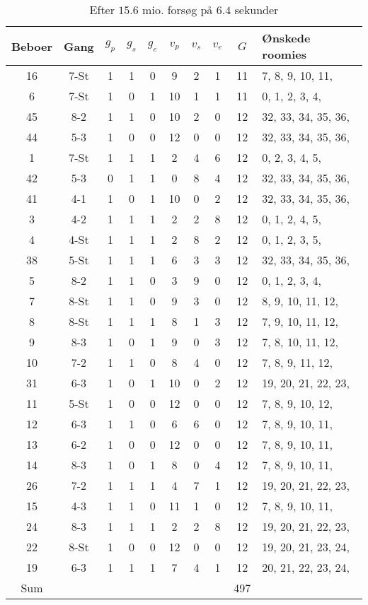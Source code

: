 \documentclass[article,oneside,11pt,a4paper]{memoir}
\newenvironment{assignment}[1]{
\begin{table}[h]
\caption{#1}
\footnotesize
\begin{center}
\begin{tabular}{cccccccccl}
\toprule
Beboer & Gang & $g_p$ & $g_s$ & $g_e$ & $v_p$ & $v_s$ & $v_e$ & $G$ & Ønskede roomies \\ \midrule
}{
\bottomrule
\end{tabular}
\end{center}
\end{table}

}
\begin{document}
\begin{assignment}{Efter $15.6$ mio. forsøg på $6.4$ sekunder}
    16 & 7-St &   1 &   1 &   0 &   9 &   2 &   1 & 11 &   7,  8,  9, 10, 11, \\
     6 & 7-St &   1 &   0 &   1 &  10 &   1 &   1 & 11 &   0,  1,  2,  3,  4, \\
    45 & 8-2  &   1 &   1 &   0 &  10 &   2 &   0 & 12 &  32, 33, 34, 35, 36, \\
    44 & 5-3  &   1 &   0 &   0 &  12 &   0 &   0 & 12 &  32, 33, 34, 35, 36, \\
     1 & 7-St &   1 &   1 &   1 &   2 &   4 &   6 & 12 &   0,  2,  3,  4,  5, \\
    42 & 5-3  &   0 &   1 &   1 &   0 &   8 &   4 & 12 &  32, 33, 34, 35, 36, \\
    41 & 4-1  &   1 &   0 &   1 &  10 &   0 &   2 & 12 &  32, 33, 34, 35, 36, \\
     3 & 4-2  &   1 &   1 &   1 &   2 &   2 &   8 & 12 &   0,  1,  2,  4,  5, \\
     4 & 4-St &   1 &   1 &   1 &   2 &   8 &   2 & 12 &   0,  1,  2,  3,  5, \\
    38 & 5-St &   1 &   1 &   1 &   6 &   3 &   3 & 12 &  32, 33, 34, 35, 36, \\
     5 & 8-2  &   1 &   1 &   0 &   3 &   9 &   0 & 12 &   0,  1,  2,  3,  4, \\
     7 & 8-St &   1 &   1 &   0 &   9 &   3 &   0 & 12 &   8,  9, 10, 11, 12, \\
     8 & 8-St &   1 &   1 &   1 &   8 &   1 &   3 & 12 &   7,  9, 10, 11, 12, \\
     9 & 8-3  &   1 &   0 &   1 &   9 &   0 &   3 & 12 &   7,  8, 10, 11, 12, \\
    10 & 7-2  &   1 &   1 &   0 &   8 &   4 &   0 & 12 &   7,  8,  9, 11, 12, \\
    31 & 6-3  &   1 &   0 &   1 &  10 &   0 &   2 & 12 &  19, 20, 21, 22, 23, \\
    11 & 5-St &   1 &   0 &   0 &  12 &   0 &   0 & 12 &   7,  8,  9, 10, 12, \\
    12 & 6-3  &   1 &   1 &   0 &   6 &   6 &   0 & 12 &   7,  8,  9, 10, 11, \\
    13 & 6-2  &   1 &   0 &   0 &  12 &   0 &   0 & 12 &   7,  8,  9, 10, 11, \\
    14 & 8-3  &   1 &   0 &   1 &   8 &   0 &   4 & 12 &   7,  8,  9, 10, 11, \\
    26 & 7-2  &   1 &   1 &   1 &   4 &   7 &   1 & 12 &  19, 20, 21, 22, 23, \\
    15 & 4-3  &   1 &   1 &   0 &  11 &   1 &   0 & 12 &   7,  8,  9, 10, 11, \\
    24 & 8-3  &   1 &   1 &   1 &   2 &   2 &   8 & 12 &  19, 20, 21, 22, 23, \\
    22 & 8-St &   1 &   0 &   0 &  12 &   0 &   0 & 12 &  19, 20, 21, 23, 24, \\
    19 & 6-3  &   1 &   1 &   1 &   7 &   4 &   1 & 12 &  20, 21, 22, 23, 24, \\
\midrule
Sum &&&&&&&& 497 & \\
\end{assignment}
\end{document}
